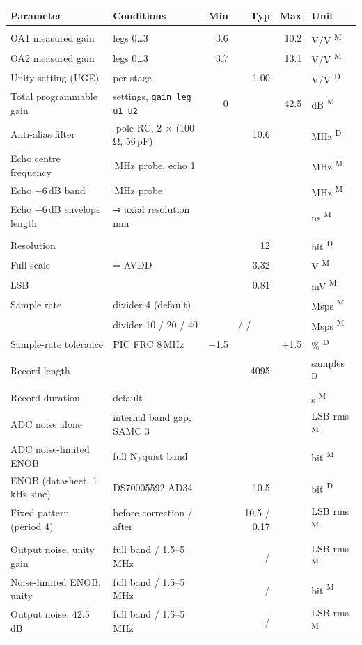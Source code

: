 \documentclass[10pt,a4paper]{article}
\makeatletter
\newcommand{\cmd}[1]{\texttt{#1}}
\newcommand{\meas}{\textsuperscript{M}}
\newcommand{\des}{\textsuperscript{D}}
\newenvironment{spec}[1]{%
  \small\begin{longtable}{@{}>{\raggedright\arraybackslash}p{50mm}>{\raggedright\arraybackslash}p{55mm}rrrl@{}}
  \toprule\textbf{Parameter} & \textbf{Conditions} & \textbf{Min} & \textbf{Typ} & \textbf{Max} & \textbf{Unit}\\\midrule\endhead
  \multicolumn{6}{@{}l}{\color{accent}\bfseries #1}\\}{\bottomrule\end{longtable}}
\newcommand{\grp}[1]{\multicolumn{6}{@{}l}{\color{accent}\bfseries #1}\\}
\makeatother
\begin{document}
\begin{spec}{Transmit (pulser)}
OA1 measured gain & legs 0…3 & 3.6 & & 10.2 & V/V \meas\\
OA2 measured gain & legs 0…3 & 3.7 & & 13.1 & V/V \meas\\
Unity setting (UGE) & per stage & & 1.00 & & V/V \des\\
Total programmable gain & 9 settings, \cmd{gain leg u1 u2} & 0 & & 42.5 & dB \meas\\
Anti-alias filter & 2-pole RC, 2 × (100\,Ω, 56\,pF) & & 10.6 & & MHz \des\\
Echo centre frequency & 3.3\,MHz probe, echo 1 & & \vfcen & & MHz \meas\\
Echo −6\,dB band & 3.3\,MHz probe & \vbwlo & & \vbwhi & MHz \meas\\
Echo −6\,dB envelope length & ⇒ axial resolution \vaxres\,mm & & \vpulselen & & ns \meas\\
\grp{ADC and acquisition}
Resolution & & & 12 & & bit \des\\
Full scale & = AVDD & & 3.32 & & V \meas\\
LSB & & & 0.81 & & mV \meas\\
Sample rate & divider 4 (default) & & \vfsdivfour & & Msps \meas\\
 & divider 10 / 20 / 40 & & \multicolumn{2}{l}{\vfsdivten{} / \vfsdivtwenty{} / \vfsdivforty} & Msps \meas\\
Sample-rate tolerance & PIC FRC 8\,MHz & −1.5 & & +1.5 & \% \des\\
Record length & & & 4095 & & samples \des\\
Record duration & default & & \vfilldivfour & & \textmu s \meas\\
ADC noise alone & internal band gap, SAMC 3 & & \vadcsigma & & LSB rms \meas\\
ADC noise-limited ENOB & full Nyquist band & & \vadcenob & & bit \meas\\
ENOB (datasheet, 1\,kHz sine) & DS70005592 AD34 & & 10.5 & & bit \des\\
Fixed pattern (period 4) & before correction / after & & 10.5 / 0.17 & & LSB rms \meas\\
\grp{System noise (ADC node, no pulse, transducer connected, correction on)}
Output noise, unity gain & full band / 1.5–5\,MHz & & \vnzunity{} / \vnzbandunity & & LSB rms \meas\\
Noise-limited ENOB, unity & full band / 1.5–5\,MHz & & \venobunity{} / \venobbandunity & & bit \meas\\
Output noise, 42.5\,dB & full band / 1.5–5\,MHz & & \vnzmax{} / \vnzbandmax & & LSB rms \meas\\

\end{spec}
\end{document}
